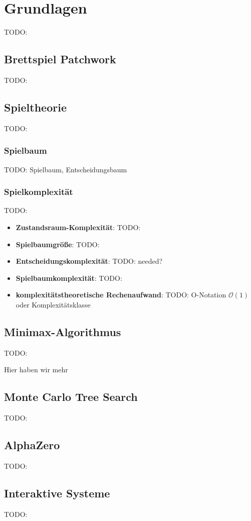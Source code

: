 \chapter{Grundlagen}
\label{chapter:grundlagen}

TODO:

\section{Brettspiel Patchwork}
\label{chapter:brettspiel-patchwork}

TODO:

\section{Spieltheorie}
\label{chapter:spieltheorie}

TODO:

\subsection{Spielbaum}

TODO: Spielbaum, Entscheidungsbaum

\subsection{Spielkomplexität}

TODO:

\begin{itemize}
    \item \textbf{Zustandsraum-Komplexität}: TODO:
    \item \textbf{Spielbaumgröße}: TODO:
    \item \textbf{Entscheidungskomplexität}: TODO: needed?
    \item \textbf{Spielbaumkomplexität}: TODO:
    \item \textbf{komplexitätstheoretische Rechenaufwand}: TODO: O-Notation $\mathcal{O}(1)$ oder Komplexitätsklasse
\end{itemize}

\section{Minimax-Algorithmus}
\label{chapter:minimax-algorithmus}

TODO:

Hier haben wir mehr

\section{Monte Carlo Tree Search}
\label{chapter:monte-carlo-tree-search}

TODO:

\section{AlphaZero}
\label{chapter:alphazero}

TODO:

\section{Interaktive Systeme}
\label{chapter:interaktive-systeme}

TODO:


